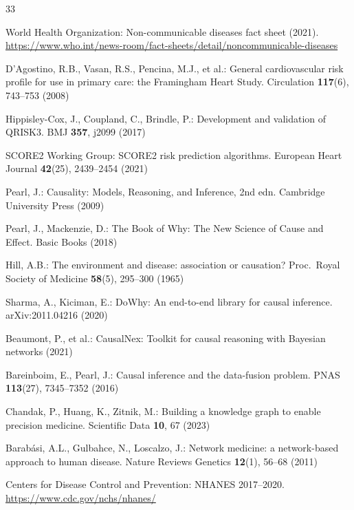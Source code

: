 \documentclass[runningheads]{llncs}
\begin{document}
\begin{thebibliography}{33}

World Health Organization:
Non-communicable diseases fact sheet (2021).
\url{https://www.who.int/news-room/fact-sheets/detail/noncommunicable-diseases}

D'Agostino, R.B., Vasan, R.S., Pencina, M.J., et al.:
General cardiovascular risk profile for use in primary care:
the Framingham Heart Study.
Circulation \textbf{117}(6), 743--753 (2008)

Hippisley-Cox, J., Coupland, C., Brindle, P.:
Development and validation of QRISK3.
BMJ \textbf{357}, j2099 (2017)

SCORE2 Working Group:
SCORE2 risk prediction algorithms.
European Heart Journal \textbf{42}(25), 2439--2454 (2021)

Pearl, J.:
Causality: Models, Reasoning, and Inference, 2nd edn.
Cambridge University Press (2009)

Pearl, J., Mackenzie, D.:
The Book of Why: The New Science of Cause and Effect.
Basic Books (2018)

Hill, A.B.:
The environment and disease: association or causation?
Proc.\ Royal Society of Medicine \textbf{58}(5), 295--300 (1965)

Sharma, A., Kiciman, E.:
DoWhy: An end-to-end library for causal inference.
arXiv:2011.04216 (2020)

Beaumont, P., et al.:
CausalNex: Toolkit for causal reasoning with Bayesian networks (2021)

Bareinboim, E., Pearl, J.:
Causal inference and the data-fusion problem.
PNAS \textbf{113}(27), 7345--7352 (2016)

Chandak, P., Huang, K., Zitnik, M.:
Building a knowledge graph to enable precision medicine.
Scientific Data \textbf{10}, 67 (2023)

Barab\'{a}si, A.L., Gulbahce, N., Loscalzo, J.:
Network medicine: a network-based approach to human disease.
Nature Reviews Genetics \textbf{12}(1), 56--68 (2011)

Centers for Disease Control and Prevention:
NHANES 2017--2020.
\url{https://www.cdc.gov/nchs/nhanes/}


\end{thebibliography}
\end{document}

